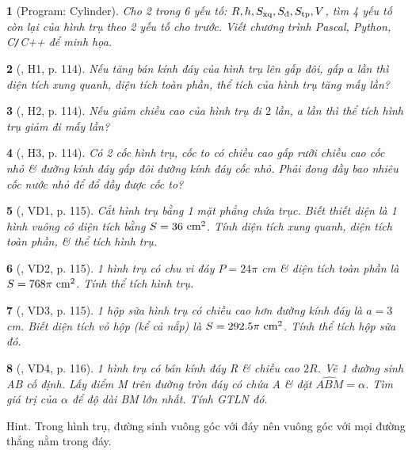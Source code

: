 \documentclass{article}
\newtheorem{baitoan}{}
\begin{document}
\begin{baitoan}[{\sf Program}: Cylinder]
	Cho 2 trong 6 yếu tố: $R,h,S_{\rm xq},S_{\scriptsize\mbox{\rm đ}},S_{\rm tp},V$, tìm 4 yếu tố còn lại của hình trụ theo 2 yếu tố cho trước. Viết chương trình {\sf Pascal, Python, C{\tt/}C++} để minh họa.
\end{baitoan}

\begin{baitoan}[\cite{Binh_boi_duong_Toan_9_tap_2}, H1, p. 114]
	Nếu tăng bán kính đáy của hình trụ lên gấp đôi, gấp $a$ lần thì diện tích xung quanh, diện tích toàn phần, thể tích của hình trụ tăng mấy lần?
\end{baitoan}

\begin{baitoan}[\cite{Binh_boi_duong_Toan_9_tap_2}, H2, p. 114]
	Nếu giảm chiều cao của hình trụ đi $2$ lần, a lần thì thể tích hình trụ giảm đi mấy lần?
\end{baitoan}

\begin{baitoan}[\cite{Binh_boi_duong_Toan_9_tap_2}, H3, p. 114]
	Có 2 cốc hình trụ, cốc to có chiều cao gấp rưỡi chiều cao cốc nhỏ \& đường kính đáy gấp đôi đường kính đáy cốc nhỏ. Phải đong đầy bao nhiêu cốc nước nhỏ để đổ đầy được cốc to?
\end{baitoan}

\begin{baitoan}[\cite{Binh_boi_duong_Toan_9_tap_2}, VD1, p. 115]
	Cắt hình trụ bằng 1 mặt phẳng chứa trục. Biết thiết diện là 1 hình vuông có diện tích bằng $S = 36\ {\rm cm}^2$. Tính diện tích xung quanh, diện tích toàn phần, \& thể tích hình trụ.
\end{baitoan}

\begin{baitoan}[\cite{Binh_boi_duong_Toan_9_tap_2}, VD2, p. 115]
	1 hình trụ có chu vi đáy $P = 24\pi$ {\rm cm} \& diện tích toàn phần là $S = 768\pi\ {\rm cm}^2$. Tính thể tích hình trụ.
\end{baitoan}

\begin{baitoan}[\cite{Binh_boi_duong_Toan_9_tap_2}, VD3, p. 115]
	1 hộp sữa hình trụ có chiều cao hơn đường kính đáy là $a = 3$ {\rm cm}. Biết diện tích vỏ hộp (kể cả nắp) là $S = 292.5\pi\ {\rm cm}^2$. Tính thể tích hộp sữa đó.
\end{baitoan}

\begin{baitoan}[\cite{Binh_boi_duong_Toan_9_tap_2}, VD4, p. 116]
	1 hình trụ có bán kính đáy R \& chiều cao $2R$. Vẽ 1 đường sinh AB cố định. Lấy điểm M trên đường tròn đáy có chứa A \& đặt $\widehat{ABM} = \alpha$. Tìm giá trị của $\alpha$ để độ dài BM lớn nhất. Tính {\rm GTLN} đó.
\end{baitoan}
{\sf Hint.} Trong hình trụ, đường sinh vuông góc với đáy nên vuông góc với mọi đường thẳng nằm trong đáy.
\end{document}

